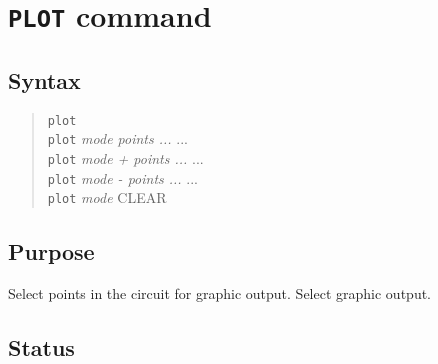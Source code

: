 %
%
%
%
\section{{\tt PLOT} command}
\subsection{Syntax}
\begin{verse}
{\tt plot}\\
{\tt plot} {\it mode points ...} ...\\
{\tt plot} {\it mode + points ...} ...\\
{\tt plot} {\it mode - points ...} ...\\
{\tt plot} {\it mode} CLEAR
\end{verse}
\subsection{Purpose}

Select points in the circuit for graphic output.  Select graphic output.
\subsection{Status}

